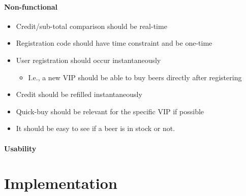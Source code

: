 \documentclass{article}
\begin{document}
\subsection{Non-functional}
\begin{itemize}
\item Credit/sub-total comparison should be real-time
\item Registration code should have time constraint and be one-time
\item User registration should occur instantaneously

  \begin{itemize}
  \item I.e., a new VIP should be able to buy beers directly after registering
  \end{itemize}
\item Credit should be refilled instantaneously
\item Quick-buy should be relevant for the specific VIP if possible
\item It should be easy to see if a beer is in stock or not.
\end{itemize}

\subsection{Usability}
\part{Implementation}
\end{document}
